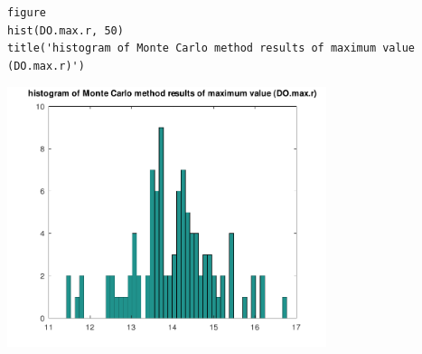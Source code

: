 \begin{lstlisting}
figure
hist(DO.max.r, 50)
title('histogram of Monte Carlo method results of maximum value (DO.max.r)')
\end{lstlisting}
\begin{center}
\includegraphics[width=0.7\textwidth]{algs_examples_published/testM_alg_example-2.pdf}
\end{center}


\stopcontents[localtoc]
